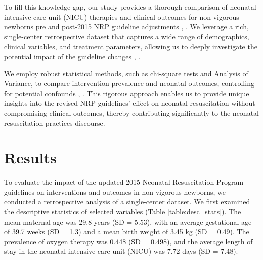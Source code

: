 \documentclass[11pt]{article}
\begin{document}
To fill this knowledge gap, our study provides a thorough comparison of neonatal intensive care unit (NICU) therapies and clinical outcomes for non-vigorous newborns pre and post-2015 NRP guideline adjustments \cite{Mileder2021TelesimulationAA}, \cite{Lindhard2021SimulationBasedNR}. We leverage a rich, single-center retrospective dataset that captures a wide range of demographics, clinical variables, and treatment parameters, allowing us to deeply investigate the potential impact of the guideline changes \cite{Chandrasekharan2020NeonatalRA}, \cite{Wyckoff2020NeonatalLS}.

We employ robust statistical methods, such as chi-square tests and Analysis of Variance, to compare intervention prevalence and neonatal outcomes, controlling for potential confounds \cite{Shi2020ClinicalCA}, \cite{Vall2015PredictorsOT}. This rigorous approach enables us to provide unique insights into the revised NRP guidelines' effect on neonatal resuscitation without compromising clinical outcomes, thereby contributing significantly to the neonatal resuscitation practices discourse.

\section*{Results}

To evaluate the impact of the updated 2015 Neonatal Resuscitation Program guidelines on interventions and outcomes in non-vigorous newborns, we conducted a retrospective analysis of a single-center dataset. We first examined the descriptive statistics of selected variables (Table {}\ref{table:desc_stats}). The mean maternal age was 29.8 years (SD = 5.53), with an average gestational age of 39.7 weeks (SD = 1.3) and a mean birth weight of 3.45 kg (SD = 0.49). The prevalence of oxygen therapy was 0.448 (SD = 0.498), and the average length of stay in the neonatal intensive care unit (NICU) was 7.72 days (SD = 7.48).
\end{document}
